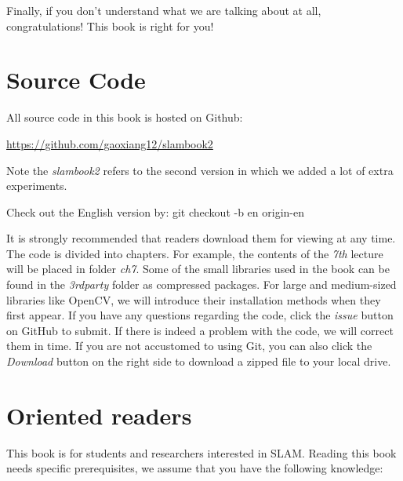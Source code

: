 Finally, if you don't understand what we are talking about at all, congratulations! This book is right for you! 

\section{Source Code}

All source code in this book is hosted on Github:

{\hfill\url{https://github.com/gaoxiang12/slambook2}\hfill}

Note the \textit{slambook2} refers to the second version in which we added a lot of extra experiments.

Check out the English version by:
{\hfill git checkout -b en origin-en\hfill}

It is strongly recommended that readers download them for viewing at any time. The code is divided into chapters. For example, the contents of the \textit{7th} lecture will be placed in folder \textit{ch7}. Some of the small libraries used in the book can be found in the \textit{3rdparty} folder as compressed packages. For large and medium-sized libraries like OpenCV, we will introduce their installation methods when they first appear. If you have any questions regarding the code, click the \textit{issue} button on GitHub to submit. If there is indeed a problem with the code, we will correct them in time. If you are not accustomed to using Git, you can also click the  \textit{Download} button on the right side to download a zipped file to your local drive.

\section{Oriented readers}

This book is for students and researchers interested in SLAM. Reading this book needs specific prerequisites, we assume that you have the following knowledge:

